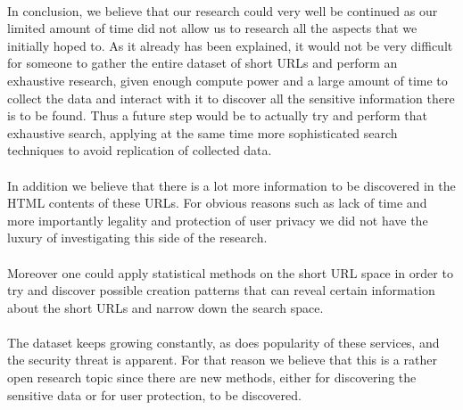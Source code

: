 \documentclass[12pt]{article}
\begin{document}
\paragraph{}
In conclusion, we believe that our research could very well be continued as our limited amount of time did not allow us to research all the aspects that we initially hoped to. As it already has been explained, it would not be very difficult for someone to gather the entire dataset of short URLs and perform an exhaustive research, given enough compute power and a large amount of time to collect the data and interact with it to discover all the sensitive information there is to be found. Thus a future step would be to actually try and perform that exhaustive search, applying at the same time more sophisticated search techniques to avoid replication of collected data. 

\paragraph{}
In addition we believe that there is a lot more information to be discovered in the HTML contents of these URLs. For obvious reasons such as lack of time and more importantly legality and protection of user privacy we did not have the luxury of investigating this side of the research. 

\paragraph{}
Moreover one could apply statistical methods on the short URL space in order to try and discover possible creation patterns that can reveal certain information about the short URLs and narrow down the search space. 

\paragraph{}
The dataset keeps growing constantly, as does popularity of these services, and the security threat is apparent. For that reason we believe that this is a rather open research topic since there are new methods, either for discovering the sensitive data or for user protection, to be discovered.

\newpage
\end{document}
